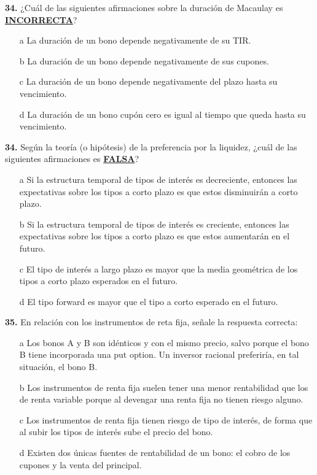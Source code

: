 \documentclass{nuevotema}
\begin{document}
\preguntas


\textbf{34.} ¿Cuál de las siguientes afirmaciones sobre la duración de Macaulay es \textbf{\underline{INCORRECTA}}?

\begin{itemize}
	\item[a] La duración de un bono depende negativamente de su TIR.
	\item[b] La duración de un bono depende negativamente de sus cupones.
	\item[c] La duración de un bono depende negativamente del plazo hasta su vencimiento.
	\item[d] La duración de un bono cupón cero es igual al tiempo que queda hasta su vencimiento.
\end{itemize}


\textbf{34.} Según la teoría (o hipótesis) de la preferencia por la liquidez, ¿cuál de las siguientes afirmaciones es \underline{\textbf{FALSA}}?

\begin{itemize}
	\item[a] Si la estructura temporal de tipos de interés es decreciente, entonces las expectativas sobre los tipos a corto plazo es que estos disminuirán a corto plazo.
	\item[b] Si la estructura temporal de tipos de interés es creciente, entonces las expectativas sobre los tipos a corto plazo es que estos aumentarán en el futuro.
	\item[c] El tipo de interés a largo plazo es mayor que la media geométrica de los tipos a corto plazo esperados en el futuro. 
	\item[d] El tipo forward es mayor que el tipo a corto esperado en el futuro.
\end{itemize}

\textbf{35.} En relación con los instrumentos de reta fija, señale la respuesta correcta:
\begin{enumerate}
	\item[a] Los bonos A y B son idénticos y con el mismo precio, salvo porque el bono B tiene incorporada una put option. Un inversor racional preferiría, en tal situación, el bono B.
	\item[b] Los instrumentos de renta fija suelen tener una menor rentabilidad que los de renta variable porque al devengar una renta fija no tienen riesgo alguno.
	\item[c] Los instrumentos de renta fija tienen riesgo de tipo de interés, de forma que al subir los tipos de interés sube el precio del bono.
	\item[d] Existen dos únicas fuentes de rentabilidad de un bono: el cobro de los cupones y la venta del principal.
\end{enumerate}
\end{document}

